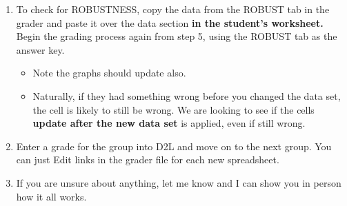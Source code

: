 \documentclass{article}
\begin{document}
\begin{enumerate}
\begin{itemize}
        \end{itemize}
        
    \item To check for ROBUSTNESS, copy the data from the ROBUST tab in the grader and paste it over the data section \textbf{in the student's worksheet.} Begin the grading process again from step 5, using the ROBUST tab as the answer key.
    
        \begin{itemize}
        
            \item Note the graphs should update also.
            
            \item Naturally, if they had something wrong before you changed the data set, the cell is likely to still be wrong. We are looking to see if the cells \textbf{update after the new data set} is applied, even if still wrong.
            
        \end{itemize}
        
    \item Enter a grade for the group into D2L and move on to the next group. You can just Edit links in the grader file for each new spreadsheet.

    \item If you are unsure about anything, let me know and I can show you in person how it all works.
    
\end{enumerate}
\end{document}
